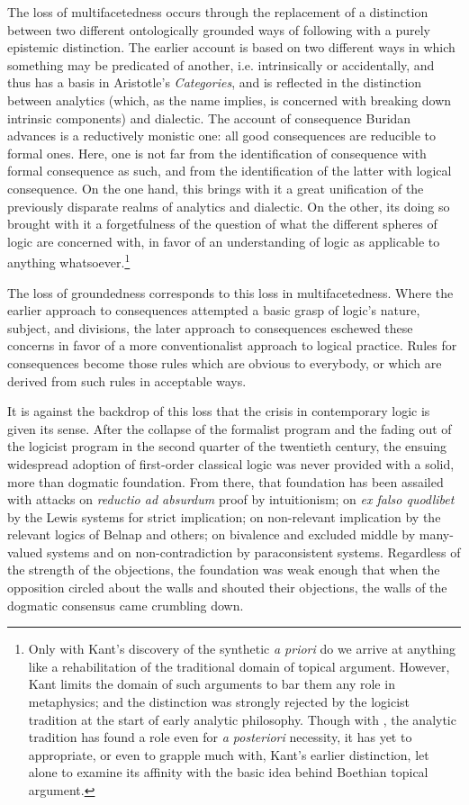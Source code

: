 The loss of multifacetedness occurs through the replacement of a distinction between two different ontologically grounded ways of following with a purely epistemic distinction. The earlier account is based on two different ways in which something may be predicated of another, i.e. intrinsically or accidentally, and thus has a basis in Aristotle's \textit{Categories}, and is reflected in the distinction between analytics (which, as the name implies, is concerned with breaking down intrinsic components) and dialectic. The account of consequence Buridan advances is a reductively monistic one: all good consequences are reducible to formal ones. Here, one is not far from the identification of consequence with formal consequence as such, and from the identification of the latter with logical consequence. On the one hand, this brings with it a great unification of the previously disparate realms of analytics and dialectic. On the other, its doing so brought with it a forgetfulness of the question of what the different spheres of logic are concerned with, in favor of an understanding of logic as applicable to anything whatsoever.\footnote{Only with Kant's discovery of the synthetic \textit{a priori} do we arrive at anything like a rehabilitation of the traditional domain of topical argument. However, Kant limits the domain of such arguments to bar them any role in metaphysics; and the distinction was strongly rejected by the logicist tradition at the start of early analytic philosophy. Though with \cite{Kripke1980}, the analytic tradition has found a role even for \textit{a posteriori} necessity, it has yet to appropriate, or even to grapple much with, Kant's earlier distinction, let alone to examine its affinity with the basic idea behind Boethian topical argument.}

The loss of groundedness corresponds to this loss in multifacetedness. Where the earlier approach to consequences attempted a basic grasp of logic's nature, subject, and divisions, the later approach to consequences eschewed these concerns in favor of a more conventionalist approach to logical practice. Rules for consequences become those rules which are obvious to everybody, or which are derived from such rules in acceptable ways.

It is against the backdrop of this loss that the crisis in contemporary logic is given its sense. After the collapse of the formalist program and the fading out of the logicist program in the second quarter of the twentieth century, the ensuing widespread adoption of first-order classical logic was never provided with a solid, more than dogmatic foundation. From there, that foundation has been assailed with attacks on \textit{reductio ad absurdum} proof by intuitionism; on \textit{ex falso quodlibet} by the Lewis systems for strict implication; on non-relevant implication by the relevant logics of Belnap and others; on bivalence and excluded middle by many-valued systems and on non-contradiction by paraconsistent systems. Regardless of the strength of the objections, the foundation was weak enough that when the opposition circled about the walls and shouted their objections, the walls of the dogmatic consensus came crumbling down. 

